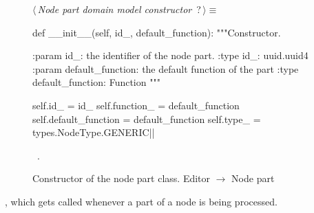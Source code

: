 \documentclass[%
    a4paper,    %
    justified,  %
    nobib,      %
    openany     %
]{tufte-book}
\begin{document}
\begin{figure}
\begin{flushleft} \small
\begin{minipage}{\linewidth}\label{scrap116}\raggedright\small
{} $\langle\,${\itshape Node part domain model constructor}\nobreak\ {\footnotesize {?}}$\,\rangle\equiv$
\vspace{-1ex}
\begin{pythoncode}
def __init__(self, id_, default_function):
    """Constructor.

    :param id_: the identifier of the node part.
    :type  id_: uuid.uuid4
    :param default_function: the default function of the part
    :type default_function: Function
    """

    self.id_              = id_
    self.function_        = default_function
    self.default_function = default_function
    self.type_            = types.NodeType.GENERIC|\NWsep|
\end{pythoncode}
\vspace{1.5ex}
\footnotesize
\begin{list}{}{\setlength{\itemsep}{-\parsep}\setlength{\itemindent}{-\leftmargin}}
\item \NWtxtMacroRefIn\ .

\item{}
\end{list}
\end{minipage}\vspace{4ex}
\end{flushleft}
\caption{Constructor of the node part class.
  \newline{}\newline{}Editor $\rightarrow$ Node part}
\label{editor:lst:node-part:constructor}
\end{figure}

, which gets called whenever a part
of a node is being processed.
\end{document}
